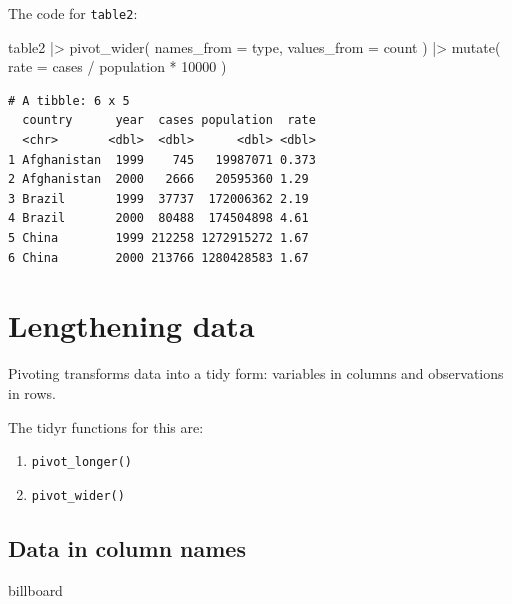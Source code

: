\documentclass[
  letterpaper,
  DIV=11,
  numbers=noendperiod]{scrreprt}
\newenvironment{Shaded}{\begin{snugshade}}{\end{snugshade}}
\newcommand{\AttributeTok}[1]{\textcolor[rgb]{0.40,0.45,0.13}{#1}}
\newcommand{\DecValTok}[1]{\textcolor[rgb]{0.68,0.00,0.00}{#1}}
\newcommand{\FunctionTok}[1]{\textcolor[rgb]{0.28,0.35,0.67}{#1}}
\newcommand{\NormalTok}[1]{\textcolor[rgb]{0.00,0.23,0.31}{#1}}
\newcommand{\SpecialCharTok}[1]{\textcolor[rgb]{0.37,0.37,0.37}{#1}}
\providecommand{\tightlist}{%
  \setlength{\itemsep}{0pt}\setlength{\parskip}{0pt}}
\begin{document}
The code for \texttt{table2}:

\begin{Shaded}
\begin{Highlighting}[]
\NormalTok{table2 }\SpecialCharTok{|\textgreater{}}
  \FunctionTok{pivot\_wider}\NormalTok{(}
    \AttributeTok{names\_from =}\NormalTok{ type,}
    \AttributeTok{values\_from =}\NormalTok{ count}
\NormalTok{  ) }\SpecialCharTok{|\textgreater{}}
  \FunctionTok{mutate}\NormalTok{(}
    \AttributeTok{rate =}\NormalTok{ cases }\SpecialCharTok{/}\NormalTok{ population }\SpecialCharTok{*} \DecValTok{10000}
\NormalTok{  )}
\end{Highlighting}
\end{Shaded}

\begin{verbatim}
# A tibble: 6 x 5
  country      year  cases population  rate
  <chr>       <dbl>  <dbl>      <dbl> <dbl>
1 Afghanistan  1999    745   19987071 0.373
2 Afghanistan  2000   2666   20595360 1.29 
3 Brazil       1999  37737  172006362 2.19 
4 Brazil       2000  80488  174504898 4.61 
5 China        1999 212258 1272915272 1.67 
6 China        2000 213766 1280428583 1.67 
\end{verbatim}

\section{Lengthening data}\label{lengthening-data}

Pivoting transforms data into a tidy form: variables in columns and
observations in rows.

The tidyr functions for this are:

\begin{enumerate}
\def\labelenumi{\arabic{enumi}.}
\tightlist
\item
  \texttt{pivot\_longer()}
\item
  \texttt{pivot\_wider()}
\end{enumerate}

\subsection{Data in column names}\label{data-in-column-names}

\begin{Shaded}
\begin{Highlighting}[]
\NormalTok{billboard}
\end{Highlighting}
\end{Shaded}
\end{document}
